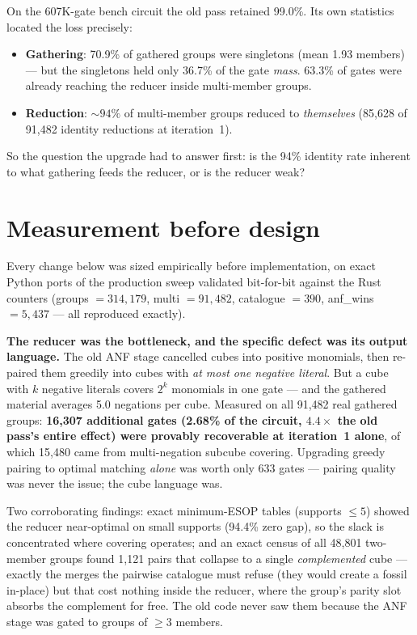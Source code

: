 \documentclass[11pt]{article}
\begin{document}
On the 607K-gate bench circuit the old pass retained 99.0\%. Its own statistics located the loss precisely:

\begin{itemize}
\item \textbf{Gathering}: 70.9\% of gathered groups were singletons (mean 1.93 members) --- but the singletons held only 36.7\% of the gate \emph{mass}. 63.3\% of gates were already reaching the reducer inside multi-member groups.
\item \textbf{Reduction}: ${\sim}94\%$ of multi-member groups reduced to \emph{themselves} (85{,}628 of 91{,}482 identity reductions at iteration~1).
\end{itemize}

So the question the upgrade had to answer first: is the 94\% identity rate inherent to what gathering feeds the reducer, or is the reducer weak?

\section{Measurement before design}

Every change below was sized empirically before implementation, on exact Python ports of the production sweep validated bit-for-bit against the Rust counters (groups $= 314{,}179$, multi $= 91{,}482$, catalogue $= 390$, anf\_wins $= 5{,}437$ --- all reproduced exactly).

\textbf{The reducer was the bottleneck, and the specific defect was its output language.} The old ANF stage cancelled cubes into positive monomials, then re-paired them greedily into cubes with \emph{at most one negative literal}. But a cube with $k$ negative literals covers $2^k$ monomials in one gate --- and the gathered material averages 5.0 negations per cube. Measured on all 91{,}482 real gathered groups: \textbf{16{,}307 additional gates (2.68\% of the circuit, $4.4\times$ the old pass's entire effect) were provably recoverable at iteration~1 alone}, of which 15{,}480 came from multi-negation subcube covering. Upgrading greedy pairing to optimal matching \emph{alone} was worth only 633 gates --- pairing quality was never the issue; the cube language was.

Two corroborating findings: exact minimum-ESOP tables (supports $\le 5$) showed the reducer near-optimal on small supports (94.4\% zero gap), so the slack is concentrated where covering operates; and an exact census of all 48{,}801 two-member groups found 1{,}121 pairs that collapse to a single \emph{complemented} cube --- exactly the merges the pairwise catalogue must refuse (they would create a fossil in-place) but that cost nothing inside the reducer, where the group's parity slot absorbs the complement for free. The old code never saw them because the ANF stage was gated to groups of $\ge 3$ members.
\end{document}
